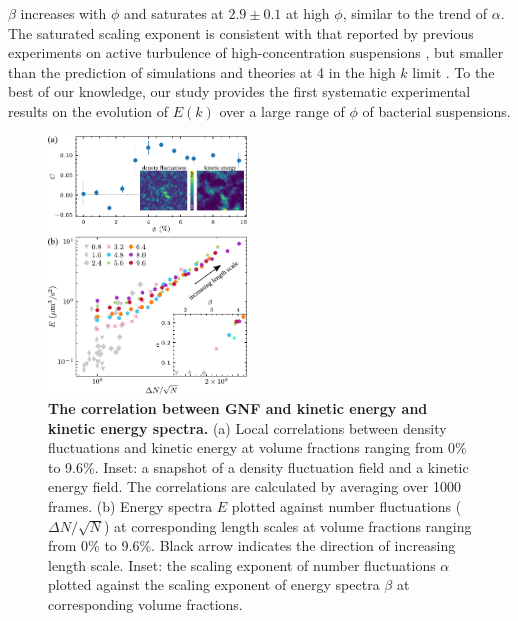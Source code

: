\documentclass[twocolumn,aps,prl,amsmath,amssymb,longbibliography]{revtex4-2}
\begin{document}
$\beta$ increases with $\phi$ and saturates at $2.9 \pm 0.1$ at high $\phi$, similar to the trend of $\alpha$. The saturated scaling exponent is consistent with that reported by previous experiments on active turbulence of high-concentration suspensions \cite{Wensink2012,Creppy2015,Patteson2018}, but smaller than the prediction of simulations and theories at 4 in the high $k$ limit
\cite{Saintillan2012,Giomi2015,Bardfalvy2019}. To the best of our knowledge, our study provides the first systematic experimental results on the evolution of $E(k)$ over a large range of $\phi$ of bacterial suspensions.

\begin{figure}[!]
\begin{center}
\includegraphics[width=0.47\textwidth]{figures/GNF-energy-spectra-correlation/v1.pdf}
\caption[The correlation between GNF and kinetic energy and kinetic energy spectra.]
{
\textbf{The correlation between GNF and kinetic energy and kinetic energy spectra.}
(a) Local correlations between density fluctuations and kinetic energy at volume fractions ranging from 0\% to 9.6\%. Inset: a snapshot of a density fluctuation field and a kinetic energy field. The correlations are calculated by averaging over 1000 frames.
(b) Energy spectra $E$ plotted against number fluctuations ($\Delta N/\sqrt N$) at corresponding length scales at volume fractions ranging from 0\% to 9.6\%. Black arrow indicates the direction of increasing length scale. Inset: the scaling exponent of number fluctuations $\alpha$ plotted against the scaling exponent of energy spectra $\beta$ at corresponding volume fractions.
}
\label{fig:GNF-energy-spectra-correlation}
\end{center}
\end{figure}
\end{document}
